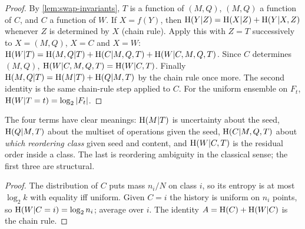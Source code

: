 \begin{proof}
By \cref{lem:swap-invariants}, $T$ is a function of $(M,Q)$, $(M,Q)$ a function of $C$, and $C$ a function of $W$. If $X=f(Y)$, then $\mathrm{H}(Y|Z)=\mathrm{H}(X|Z)+\mathrm{H}(Y|X,Z)$ whenever $Z$ is determined by $X$ (chain rule). Apply this with $Z=T$ successively to $X=(M,Q)$, $X=C$ and $X=W$: $\mathrm{H}(W|T)=\mathrm{H}(M,Q|T)+\mathrm{H}(C|M,Q,T)+\mathrm{H}(W|C,M,Q,T)$. Since $C$ determines $(M,Q)$, $\mathrm{H}(W|C,M,Q,T)=\mathrm{H}(W|C,T)$. Finally $\mathrm{H}(M,Q|T)=\mathrm{H}(M|T)+\mathrm{H}(Q|M,T)$ by the chain rule once more. The second identity is the same chain-rule step applied to $C$. For the uniform ensemble on $F_t$, $\mathrm{H}(W|T=t)=\log_2|F_t|$.
\end{proof}
The four terms have clear meanings: $\mathrm{H}(M|T)$ is uncertainty about the seed, $\mathrm{H}(Q|M,T)$ about the multiset of operations given the seed, $\mathrm{H}(C|M,Q,T)$ about \emph{which reordering class} given seed and content, and $\mathrm{H}(W|C,T)$ is the residual order inside a class. The last is reordering ambiguity in the classical sense; the first three are structural.

\begin{proof}
The distribution of $C$ puts mass $n_i/N$ on class $i$, so its entropy is at most $\log_2k$ with equality iff uniform. Given $C=i$ the history is uniform on $n_i$ points, so $\mathrm{H}(W|C=i)=\log_2n_i$; average over $i$. The identity $A=\mathrm{H}(C)+\mathrm{H}(W|C)$ is the chain rule.
\end{proof}

